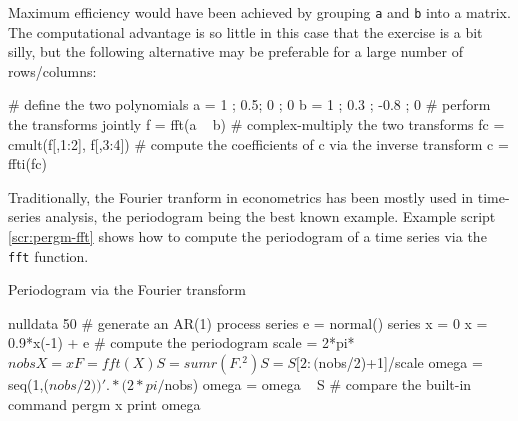 Maximum efficiency would have been achieved by grouping \texttt{a} and
\texttt{b} into a matrix.  The computational advantage is so little in
this case that the exercise is a bit silly, but the following
alternative may be preferable for a large number of
rows/columns:
\begin{code}
# define the two polynomials
a = { 1 ; 0.5; 0 ; 0 }
b = { 1 ; 0.3 ; -0.8 ; 0 }
# perform the transforms jointly
f = fft(a ~ b)
# complex-multiply the two transforms 
fc = cmult(f[,1:2], f[,3:4])
# compute the coefficients of c via the inverse transform
c = ffti(fc)
\end{code}

Traditionally, the Fourier tranform in econometrics has been mostly
used in time-series analysis, the periodogram being the best known
example. Example script \ref{scr:pergm-fft} shows how to compute the
periodogram of a time series via the \texttt{fft} function.

\begin{script}[htbp]
  \caption{Periodogram via the Fourier transform}
  \label{scr:pergm-fft}
\begin{scode}
nulldata 50
# generate an AR(1) process
series e = normal()
series x = 0
x = 0.9*x(-1) + e
# compute the periodogram
scale = 2*pi*$nobs
X = { x }
F = fft(X)
S = sumr(F.^2)
S = S[2:($nobs/2)+1]/scale
omega = seq(1,($nobs/2))' .* (2*pi/$nobs)
omega = omega ~ S
# compare the built-in command
pergm x  
print omega
\end{scode}
\end{script}


